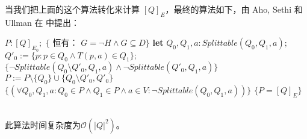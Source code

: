 当我们把上面的这个算法转化来计算 $[Q]_E$，最终的算法如下，由 Aho, Sethi 和 Ullman 在 \cite[Alg.3.6]{ASU86} 中提出：
\begin{algorithm}
    \caption{}\label{al:4-4}
    \begin{algorithmic}[1]
        \State $P:[Q]_{E_0};$ 
        \State $\{$ 恒有： $G= \neg H \land G \subseteq D \} $
            \State \textbf{let} $Q_0,Q_1,a:Splittable(Q_0,Q_1,a);$
            \State  $Q'_0 := \{ p:p\in Q_0 \land T(p,a) \in Q_1 \};$
            \State  $\{ \neg Splittable (Q_0 \setminus Q'_0 ,Q_1 ,a ) \land \neg Splittable (Q'_0,Q_1,a) \}$
            \State  $P := P \setminus \{Q_0\} \cup \{Q_0 \setminus Q'_0,Q'_0 \}$
        \Until 
        \State $ \{ (\forall Q_0,Q_1,a : Q_0 \in P \land Q_1 \in P \land a \in V : \neg Splittable (Q_0,Q_1,a))  \} $
        \State $\{  P = [Q]_E \}$
    \end{algorithmic}
\end{algorithm}
\\ 此算法时间复杂度为$\mathcal{O}(|Q|^2)$。


